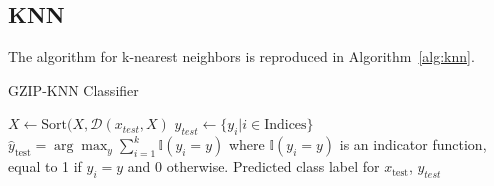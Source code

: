 \documentclass{article}
\newcommand{\cm}[1]{\textit{{\color{blue}#1}}}
\begin{document}

\subsection{KNN}
The algorithm for k-nearest neighbors is reproduced in Algorithm~\ref{alg:knn}.

\begin{algorithm}
    \caption{GZIP-KNN Classifier}
    \label{alg:knn}
    \begin{algorithmic}
    \State $ X \leftarrow \textrm{Sort}(X, \mathcal{D}(x_{test}, X)
    $
    \State $y_{test} \leftarrow \{y_i | i \in \textrm{Indices}\}$
    \State $\hat{y}_{\text{test}} = \arg\max_y \sum_{i=1}^{k} \mathbb{I}(y_i = y)$
    where $\mathbb{I}(y_i = y)$ is an indicator function, equal to 1 if $y_i = y$ and 0 otherwise.
    \State \Return Predicted class label for $x_{\text{test}}$, $y_{test}$
    \end{algorithmic}
\end{algorithm}
\end{document}
